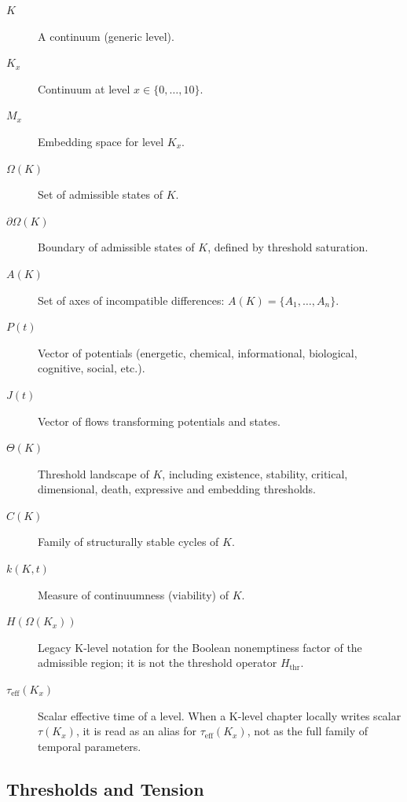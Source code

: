 \begin{description}
  \item[\(K\)] A continuum (generic level).
  \item[\(K_x\)] Continuum at level \(x\in\{0,\dots,10\}\).
  \item[\(M_x\)] Embedding space for level \(K_x\).
  \item[\(\Omega(K)\)] Set of admissible states of \(K\).
  \item[\(\partial\Omega(K)\)] Boundary of admissible states of \(K\), defined
        by threshold saturation.
  \item[\(A(K)\)] Set of axes of incompatible differences:
        \(A(K) = \{A_1,\dots,A_n\}\).
  \item[\(P(t)\)] Vector of potentials (energetic, chemical, informational,
        biological, cognitive, social, etc.).
  \item[\(J(t)\)] Vector of flows transforming potentials and states.
  \item[\(\Theta(K)\)] Threshold landscape of \(K\), including existence,
        stability, critical, dimensional, death, expressive and embedding
        thresholds.
  \item[\(C(K)\)] Family of structurally stable cycles of \(K\).
  \item[\(k(K,t)\)] Measure of continuumness (viability) of \(K\).
  \item[\(H(\Omega(K_x))\)] Legacy K-level notation for the Boolean
        nonemptiness factor of the admissible region; it is not the threshold
        operator \(H_{\mathrm{thr}}\).
  \item[\(\tau_{\mathrm{eff}}(K_x)\)] Scalar effective time of a level. When a
        K-level chapter locally writes scalar \(\tau(K_x)\), it is read as an
        alias for \(\tau_{\mathrm{eff}}(K_x)\), not as the full family of
        temporal parameters.
\end{description}

\subsection{Thresholds and Tension}

